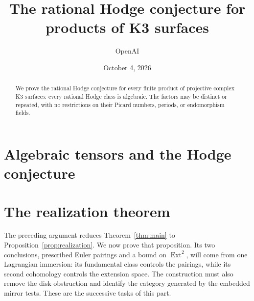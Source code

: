 \documentclass[11pt]{article}
\title{The rational Hodge conjecture for products of K3 surfaces}
\author{OpenAI}
\date{October 4, 2026}
\numberwithin{equation}{section}
\theoremstyle{definition}
\theoremstyle{remark}
\DeclareMathOperator{\Ext}{Ext}
\begin{document}
\maketitle
\begin{abstract}
We prove the rational Hodge conjecture for every finite product of projective
complex K3 surfaces: every rational Hodge class is algebraic.  The factors
may be distinct or repeated, with no restrictions on their Picard numbers,
periods, or endomorphism fields.
\end{abstract}
\tableofcontents



\part{Algebraic tensors and the Hodge conjecture}
\label{part:algebraic}






\part{The realization theorem}
\label{part:realization}

The preceding argument reduces Theorem~\ref{thm:main} to
Proposition~\ref{prop:realization}.  We now prove that proposition.
Its two conclusions, prescribed Euler pairings and a bound on
\(\Ext^2\), will come from one Lagrangian immersion: its fundamental
class controls the pairings, while its second cohomology controls the
extension space.  The construction must also remove the disk
obstruction and identify the category generated by the embedded mirror
tests.  These are the successive tasks of this part.








\end{document}
